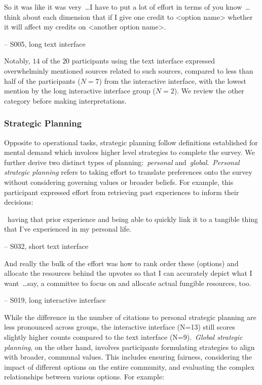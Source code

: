 \begin{displayquote}
So it was like it was very~\ldots I have to put a lot of effort in terms of you know~\ldots think about each dimension that if I give one credit to <option name> whether it will affect my credits on <another option name>.

\noindent \hfill -- S005, long text interface
\end{displayquote}

Notably, $14$ of the $20$ participants using the text interface expressed overwhelminly mentioned sources related to such sources, compared to less than half of the participants ($N=7$) from the interactive interface, with the lowest mention by the long interactive interface group ($N=2$). We review the other category before making interpretations.

\subsubsection{Strategic Planning} Opposite to operational tasks, strategic planning follow definitions established for mental demand which involces higher level strategies to complete the survey. We further derive two distinct types of planning:~\textit{personal} and~\textit{global}.~\textit{Personal strategic planning} refers to taking effort to translate preferences onto the survey without considering governing values or broader beliefs. For example, this participant expressed effort from retrieving past experiences to inform their decisions:

\begin{displayquote}
~\bracketellipsis having that prior experience and being able to quickly link it to a tangible thing that I've experienced in my personal life.

\noindent \hfill -- S032, short text interface
\end{displayquote}

\begin{displayquote}
And really the bulk of the effort was how to rank order these (options) and allocate the resources behind the upvotes so that I can accurately depict what I want~\ldots say, a committee to focus on and allocate actual fungible resources, too. 

\noindent \hfill -- S019, long interactive interface
\end{displayquote}

While the difference in the number of citations to personal strategic planning are less pronounced across groups, the interactive interface (N=13) still scores slightly higher counts compared to the text interface (N=9).~\textit{Global strategic planning}, on the other hand, involves participants formulating strategies to align with broader, communal values. This includes ensuring fairness, considering the impact of different options on the entire community, and evaluating the complex relationships between various options. For example:

